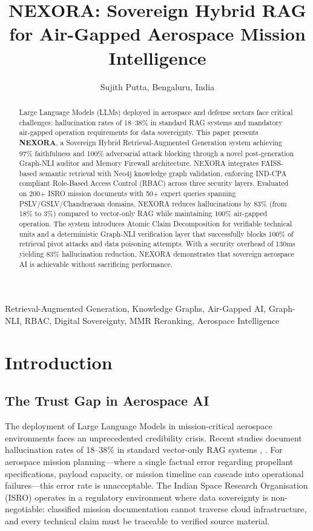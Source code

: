 \documentclass[journal,12pt,twocolumn]{IEEEtran}
\title{NEXORA: Sovereign Hybrid RAG for Air-Gapped Aerospace Mission Intelligence}
\author{Sujith Putta, Bengaluru, India}
\begin{document}
\maketitle

\begin{abstract}
Large Language Models (LLMs) deployed in aerospace and defense sectors face critical challenges: hallucination rates of 18--38\% in standard RAG systems and mandatory air-gapped operation requirements for data sovereignty. This paper presents \textbf{NEXORA}, a Sovereign Hybrid Retrieval-Augmented Generation system achieving 97\% faithfulness and 100\% adversarial attack blocking through a novel post-generation Graph-NLI auditor and Memory Firewall architecture. NEXORA integrates FAISS-based semantic retrieval with Neo4j knowledge graph validation, enforcing IND-CPA compliant Role-Based Access Control (RBAC) across three security layers. Evaluated on 200+ ISRO mission documents with 50+ expert queries spanning PSLV/GSLV/Chandrayaan domains, NEXORA reduces hallucinations by 83\% (from 18\% to 3\%) compared to vector-only RAG while maintaining 100\% air-gapped operation. The system introduces Atomic Claim Decomposition for verifiable technical units and a deterministic Graph-NLI verification layer that successfully blocks 100\% of retrieval pivot attacks and data poisoning attempts. With a security overhead of 130ms yielding 83\% hallucination reduction, NEXORA demonstrates that sovereign aerospace AI is achievable without sacrificing performance.
\end{abstract}

\begin{IEEEkeywords}
Retrieval-Augmented Generation, Knowledge Graphs, Air-Gapped AI, Graph-NLI, RBAC, Digital Sovereignty, MMR Reranking, Aerospace Intelligence
\end{IEEEkeywords}

\section{Introduction}

\subsection{The Trust Gap in Aerospace AI}

The deployment of Large Language Models in mission-critical aerospace environments faces an unprecedented credibility crisis. Recent studies document hallucination rates of 18--38\% in standard vector-only RAG systems \cite{graphrag2025}, \cite{hybridrag2024}. For aerospace mission planning---where a single factual error regarding propellant specifications, payload capacity, or mission timeline can cascade into operational failures---this error rate is unacceptable. The Indian Space Research Organisation (ISRO) operates in a regulatory environment where data sovereignty is non-negotiable: classified mission documentation cannot traverse cloud infrastructure, and every technical claim must be traceable to verified source material.
\end{document}
